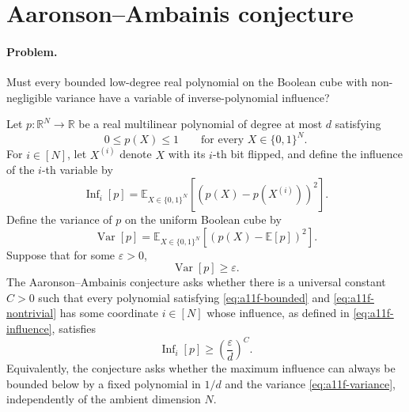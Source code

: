 \section{Aaronson–Ambainis conjecture}
\label{sec:op_a11fdfadc84e4379}

\paragraph{Problem.}
Must every bounded low-degree real polynomial on the Boolean cube with
non-negligible variance have a variable of inverse-polynomial influence?

Let $p:\mathbb R^N\to\mathbb R$ be a real multilinear polynomial of degree
at most $d$ satisfying
\begin{equation}
  0\leq p(X)\leq 1
  \qquad
  \text{for every }X\in\{0,1\}^N .
  \label{eq:a11f-bounded}
\end{equation}
For $i\in[N]$, let $X^{(i)}$ denote $X$ with its $i$-th bit flipped, and
define the influence of the $i$-th variable by
\begin{equation}
  \operatorname{Inf}_i[p]
  =
  \mathbb E_{X\in\{0,1\}^N}
  \left[
    \left(
      p(X)-p(X^{(i)})
    \right)^2
  \right].
  \label{eq:a11f-influence}
\end{equation}
Define the variance of $p$ on the uniform Boolean cube by
\begin{equation}
  \operatorname{Var}[p]
  =
  \mathbb E_{X\in\{0,1\}^N}
  \left[
    \left(
      p(X)-\mathbb E[p]
    \right)^2
  \right].
  \label{eq:a11f-variance}
\end{equation}
Suppose that for some $\varepsilon>0$,
\begin{equation}
  \operatorname{Var}[p]\geq\varepsilon .
  \label{eq:a11f-nontrivial}
\end{equation}
The Aaronson--Ambainis conjecture asks whether there is a universal constant
$C>0$ such that every polynomial satisfying \eqref{eq:a11f-bounded} and
\eqref{eq:a11f-nontrivial} has some coordinate $i\in[N]$ whose influence,
as defined in \eqref{eq:a11f-influence}, satisfies
\begin{equation}
  \operatorname{Inf}_i[p]
  \geq
  \left(\frac{\varepsilon}{d}\right)^C .
  \label{eq:a11f-conjecture}
\end{equation}
Equivalently, the conjecture asks whether the maximum influence can always be
bounded below by a fixed polynomial in $1/d$ and the variance
\eqref{eq:a11f-variance}, independently of the ambient dimension $N$.

